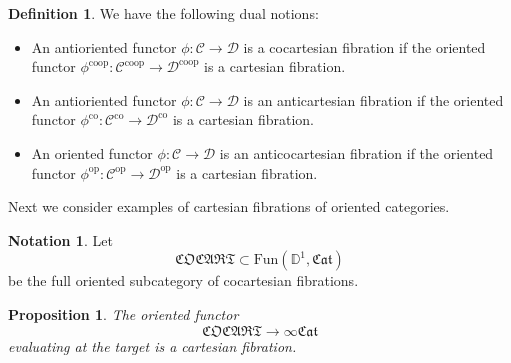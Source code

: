 \documentclass[10pt,oneside]{article}
\numberwithin{equation}{section} %
\numberwithin{figure}{section} %
\theoremstyle{plain}
\newtheorem{proposition}[theorem]{Proposition}
\theoremstyle{definition}
\newtheorem{definition}[theorem]{Definition}
\newtheorem{notation}[theorem]{Notation}
\newtheorem{remark}[theorem]{Remark}
\newcommand{\bD}{{\mathbb D}}
\newcommand{\mC}{{\mathcal C}}
\newcommand{\mD}{{\mathcal D}}
\newcommand{\K}{{K}}
\newcommand{\op}{\mathrm{op}}
\newcommand{\co}{\mathrm{co}}
\newcommand{\Fun}{\mathrm{Fun}}
\newcommand{\coop}{\mathrm{coop}}
\newcommand{\fcat}{\mathfrak{Cat}}
\begin{document}

    

\begin{definition}We have the following dual notions:

\begin{itemize}

\item An antioriented functor $\phi: \mC \to \mD$ is a cocartesian fibration
if the oriented functor $\phi^\coop: \mC^\coop \to \mD^\coop$ is a cartesian fibration.

\item An antioriented functor $\phi: \mC \to \mD$ is an anticartesian fibration
if the oriented functor $\phi^\co: \mC^\co \to \mD^\co$ is a cartesian fibration.

\item An oriented functor $\phi: \mC \to \mD$ is an anticocartesian fibration
if the oriented functor $\phi^\op: \mC^\op \to \mD^\op$ is a cartesian fibration.

\end{itemize}
    
\end{definition}

Next we consider examples of cartesian fibrations of oriented categories.

\begin{notation}
Let $$ \mathfrak{COCART} \subset \Fun(\bD^1, \fcat)$$ be the full oriented subcategory of cocartesian fibrations.
    
\end{notation}

\begin{proposition}\label{orientfibru}
The oriented functor $$\mathfrak{COCART} \to \infty\fcat $$
evaluating at the target is a cartesian fibration.

\end{proposition}
\end{document}
